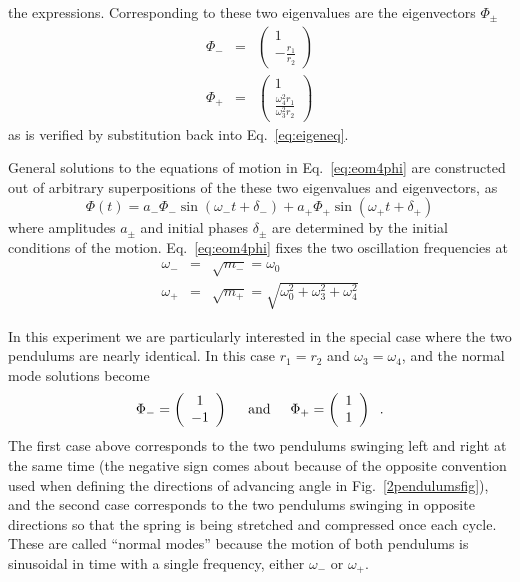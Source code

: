\documentclass{revtex4}
\begin{document}
the expressions.  Corresponding to these two eigenvalues are the
eigenvectors $\Phi_{\pm}$
\begin{eqnarray}
\Phi_- &=& \left(
\begin{array}{c}
1 \\
-\frac{r_1}{r_2}
\end{array}\right) \\
\Phi_+ &=& \left(
\begin{array}{c}
1 \\
\frac{\omega_4^2 r_1}{\omega_3^2 r_2}
\end{array}\right)
\end{eqnarray}
as is verified by substitution back into Eq.~\ref{eq:eigeneq}.

General solutions to the equations of motion in
Eq.~\ref{eq:eom4phi} are constructed out of arbitrary superpositions
of the these two eigenvalues and eigenvectors, as
\begin{equation}
\Phi(t) = a_-\Phi_-\sin(\omega_-t+\delta_-)
        + a_+\Phi_+\sin(\omega_+t+\delta_+) \label{eq:superp}
\end{equation}
where amplitudes $a_{\pm}$ and initial phases $\delta_{\pm}$ are
determined by the initial conditions of the motion.  Eq.~\ref{eq:eom4phi}
fixes the two oscillation frequencies at
\begin{eqnarray}
\omega_- &=& \sqrt{m_-} = \omega_0 \label{eq:omega-} \\
\omega_+ &=& \sqrt{m_+} = \sqrt{\omega_0^2+\omega_3^2+\omega_4^2}
\label{eq:omega+}
\end{eqnarray}

In this experiment we are particularly interested in the special case
where the two pendulums are nearly identical.  In this case $r_1=r_2$
and $\omega_3=\omega_4$, and the normal mode solutions become
\[
\Phi_- = \left(
\begin{array}{c}
1 \\ 
-1
\end{array}\right)\hspace*{5mm}
\mbox{and}\hspace*{5mm}
\Phi_+ = \left(
\begin{array}{c}
1 \\ 
1
\end{array}\right)\hspace*{2mm}.
\]
The first case above corresponds to the two pendulums swinging left
and right at the same time (the negative sign comes about because of
the opposite convention used when defining the directions of advancing
angle in Fig.~\ref{2pendulumsfig}), and the second case corresponds to
the two pendulums swinging in opposite directions so that the spring
is being stretched and compressed once each cycle.  These are called
``normal modes'' because the motion of both pendulums is sinusoidal in
time with a single frequency, either $\omega_-$ or $\omega_+$.
\end{document}
